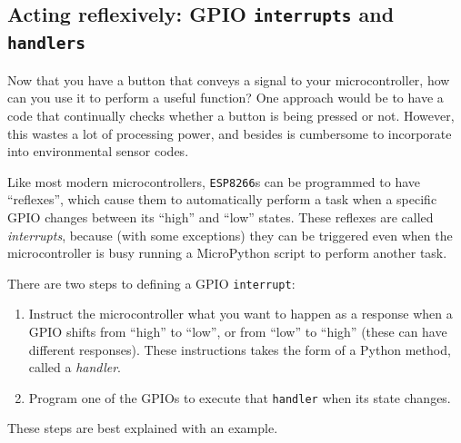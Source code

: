 \subsection{Acting reflexively: GPIO \texttt{interrupts} and \texttt{handlers}}
Now that you have a button that conveys a signal to your microcontroller, how can you use it to perform a useful function? 
One approach would be to have a code that continually checks whether a button is being pressed or not. 
However, this wastes a lot of processing power, and besides is cumbersome to incorporate into environmental sensor codes.

Like most modern microcontrollers, \texttt{ESP8266}s can be programmed to have ``reflexes'', which cause them to automatically perform a task when a specific GPIO changes between its ``high'' and ``low'' states. 
These reflexes are called \emph{interrupts}, because (with some exceptions) they can be triggered even when the microcontroller is busy running a MicroPython script to perform another task. 

There are two steps to defining a GPIO \texttt{interrupt}:
\begin{enumerate}
	\item Instruct the microcontroller what you want to happen as a response when a GPIO shifts from ``high'' to ``low'', or from ``low'' to ``high'' (these can have different responses). 
	These instructions takes the form of a Python method, called a \emph{handler}. 
	
	\item Program one of the GPIOs to execute that \texttt{handler} when its state changes.

\end{enumerate}
These steps are best explained with an example. 


